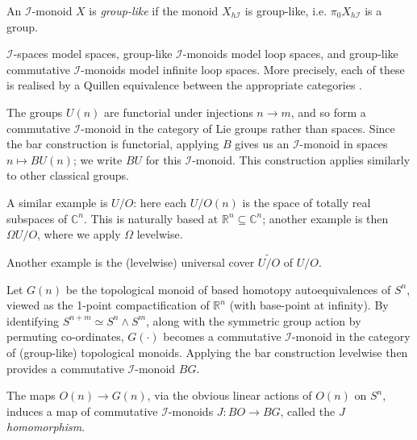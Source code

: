\documentclass{TPmod}
\def\bC{\mathbb{C}}
\def\bR{\mathbb{R}}
\newcommand{\cI}{\mathcal{I}}
\renewcommand{\cong}{\simeq}
\numberwithin{equation}{section}
\begin{document}
    \begin{defn}
        An $\cI$-monoid $X$ is \emph{group-like} if the monoid $X_{h\cI}$ is group-like, i.e. $\pi_0 X_{h\cI}$ is a group.
    \end{defn}

    \begin{rmk}
        $\cI$-spaces model spaces, group-like $\cI$-monoids model loop spaces, and group-like commutative $\cI$-monoids model infinite loop spaces. More precisely, each of these is realised by a Quillen equivalence between the appropriate categories \cite{Sagave-Schlichtkrull:Diagram}.
    \end{rmk}
    \begin{ex}
        The groups $U(n)$ are functorial under injections $n \to m$, and so form a commutative $\cI$-monoid in the category of Lie groups rather than spaces. Since the bar construction is functorial, applying $B$ gives us an $\cI$-monoid in spaces $n \mapsto BU(n)$; we write $BU$ for this $\cI$-monoid. This construction applies similarly to other classical groups.

        A similar example is $U/O$: here each $U/O(n)$ is the space of totally real subspaces of $\bC^n$. This is naturally based at $\bR^n \subseteq \bC^n$; another example is then $\Omega U/O$, where we apply $\Omega$ levelwise.

        Another example is the (levelwise) universal cover $\widetilde{U/O}$ of $U/O$.
    \end{ex}
    \begin{ex}\label{ex: G as I}
        Let $G(n)$ be the topological monoid of based homotopy autoequivalences of $S^n$, viewed as the 1-point compactification of $\bR^n$ (with base-point at infinity). By identifying $S^{n+m} \cong S^n \wedge S^m$, along with the symmetric group action by permuting co-ordinates, $G(\cdot)$ becomes a commutative $\cI$-monoid in the category of (group-like) topological monoids. Applying the bar construction levelwise then provides a commutative $\cI$-monoid $BG$.
    \end{ex}
    \begin{ex}
        The maps $O(n) \to G(n)$, via the obvious linear actions of $O(n)$ on $S^n$, induces a map of commutative $\cI$-monoids $J: BO \to BG$, called the \emph{$J$ homomorphism}.
    \end{ex}
\end{document}
